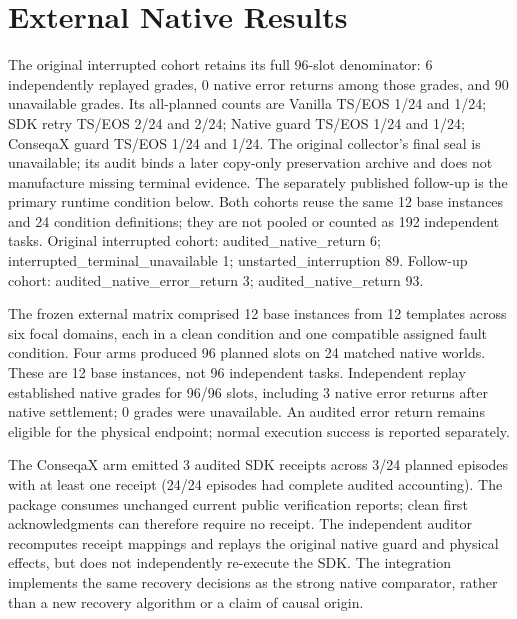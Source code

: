\section{External Native Results}\label{sec:limbo-results}

The original interrupted cohort retains its full 96-slot denominator: 6 independently replayed grades, 0 native error returns among those grades, and 90 unavailable grades. Its all-planned counts are Vanilla TS/EOS 1/24 and 1/24; SDK retry TS/EOS 2/24 and 2/24; Native guard TS/EOS 1/24 and 1/24; ConseqaX guard TS/EOS 1/24 and 1/24. The original collector's final seal is unavailable; its audit binds a later copy-only preservation archive and does not manufacture missing terminal evidence. The separately published follow-up is the primary runtime condition below. Both cohorts reuse the same 12 base instances and 24 condition definitions; they are not pooled or counted as 192 independent tasks. Original interrupted cohort: audited\_native\_return 6; interrupted\_terminal\_unavailable 1; unstarted\_interruption 89. Follow-up cohort: audited\_native\_error\_return 3; audited\_native\_return 93.



The frozen external matrix comprised 12 base instances from 12 templates across six focal domains, each in a clean condition and one compatible assigned fault condition. Four arms produced 96 planned slots on 24 matched native worlds. These are 12 base instances, not 96 independent tasks. Independent replay established native grades for 96/96 slots, including 3 native error returns after native settlement; 0 grades were unavailable. An audited error return remains eligible for the physical endpoint; normal execution success is reported separately.

\begin{table}[t]
\caption{All-planned native results. Graded means an independently replayed native grade; it includes native error returns after settlement. Missing is not an invented semantic zero.}
\label{tab:limbo-results}\centering\small\setlength{\tabcolsep}{3pt}

\end{table}

The ConseqaX arm emitted 3 audited SDK receipts across 3/24 planned episodes with at least one receipt (24/24 episodes had complete audited accounting). The package consumes unchanged current public verification reports; clean first acknowledgments can therefore require no receipt. The independent auditor recomputes receipt mappings and replays the original native guard and physical effects, but does not independently re-execute the SDK. The integration implements the same recovery decisions as the strong native comparator, rather than a new recovery algorithm or a claim of causal origin.

